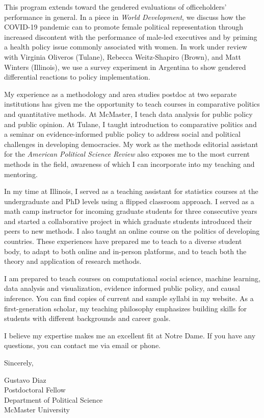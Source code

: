 \documentclass[
  11pt,
]{article}
\begin{document}
This program extends toward the gendered evaluations of officeholders'
performance in general. In a piece in \emph{World Development}, we
discuss how the COVID-19 pandemic can to promote female political
representation through increased discontent with the performance of
male-led executives and by priming a health policy issue commonly
associated with women. In work under review with Virginia Oliveros
(Tulane), Rebecca Weitz-Shapiro (Brown), and Matt Winters (Illinois), we
use a survey experiment in Argentina to show gendered differential
reactions to policy implementation.

My experience as a methodology and area studies postdoc at two separate
institutions has given me the opportunity to teach courses in
comparative politics and quantitative methods. At McMaster, I teach data
analysis for public policy and public opinion. At Tulane, I taught
introduction to comparative politics and a seminar on evidence-informed
public policy to address social and political challenges in developing
democracies. My work as the methods editorial assistant for the
\emph{American Political Science Review} also exposes me to the most
current methods in the field, awareness of which I can incorporate into
my teaching and mentoring.

In my time at Illinois, I served as a teaching assistant for statistics
courses at the undergraduate and PhD levels using a flipped classroom
approach. I served as a math camp instructor for incoming graduate
students for three consecutive years and started a collaborative project
in which graduate students introduced their peers to new methods. I also
taught an online course on the politics of developing countries. These
experiences have prepared me to teach to a diverse student body, to
adapt to both online and in-person platforms, and to teach both the
theory and application of research methods.

I am prepared to teach courses on computational social science, machine
learning, data analysis and visualization, evidence informed public
policy, and causal inference. You can find copies of current and sample
syllabi in my website. As a first-generation scholar, my teaching
philosophy emphasizes building skills for students with different
backgrounds and career goals.

I believe my expertise makes me an excellent fit at Notre Dame. If you
have any questions, you can contact me via email or phone.

Sincerely,

Gustavo Diaz\\
Postdoctoral Fellow\\
Department of Political Science\\
McMaster University
\end{document}
